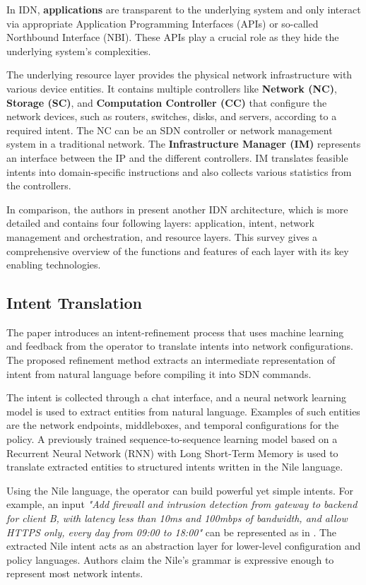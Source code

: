 In IDN, \textbf{applications} are transparent to the underlying system and only interact via appropriate Application Programming Interfaces (APIs) or so-called Northbound Interface (NBI). These APIs play a crucial role as they hide the underlying system's complexities.

The underlying resource layer provides the physical network infrastructure with various device entities. It contains multiple controllers like \textbf{Network (NC)}, \textbf{Storage (SC)}, and \textbf{Computation Controller (CC)} that configure the network devices, such as routers, switches, disks, and servers, according to a required intent. The NC can be an SDN controller or network management system in a traditional network. The \textbf{Infrastructure Manager (IM)} represents an interface between the IP and the different controllers. IM translates feasible intents into domain-specific instructions and also collects various statistics from the controllers.

In comparison, the authors in \cite[13]{Mehmood2021} present another IDN architecture, which is more detailed and contains four following layers: application, intent, network management and orchestration, and resource layers. This survey gives a comprehensive overview of the functions and features of each layer with its key enabling technologies.


\subsection{Intent Translation}

The paper \cite{Jacobs2018} introduces an intent-refinement process that uses machine learning and feedback from the operator to translate intents into network configurations. The proposed refinement method extracts an intermediate representation of intent from natural language before compiling it into SDN commands.

The intent is collected through a chat interface, and a neural network learning model is used to extract entities from natural language. Examples of such entities are the network endpoints, middleboxes, and temporal configurations for the policy. A previously trained sequence-to-sequence learning model based on a Recurrent Neural Network (RNN) with Long Short-Term Memory is used to translate extracted entities to structured intents written in the Nile language. 

Using the Nile language, the operator can build powerful yet simple intents. For example, an input \textit{"Add firewall and intrusion detection from gateway to backend for client B, with latency less than 10ms and 100mbps of bandwidth, and allow HTTPS only, every day from 09:00 to 18:00"} can be represented as in . The extracted Nile intent acts as an abstraction layer for lower-level configuration and policy languages. Authors claim the Nile's grammar is expressive enough to represent most network intents.


